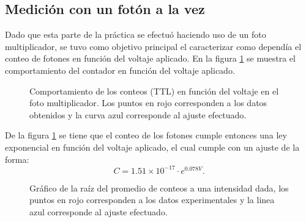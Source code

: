 \documentclass[%
 reprint,
 amsmath,amssymb,
 aps,
]{revtex4-1}
\begin{document}
{\subsection{Medición con un fotón a la vez}
Dado que esta parte de la práctica se efectuó haciendo uso de un foto multiplicador, se tuvo como objetivo principal el caracterizar como dependía el conteo de fotones en función del voltaje aplicado. En la figura \ref{fotomultiplicador} se muestra el comportamiento del contador en función del voltaje aplicado.

\begin{figure}[ht]
\caption{\label{fotomultiplicador}Comportamiento de los conteos (TTL) en función del voltaje en el foto multiplicador. Los puntos en rojo corresponden a los datos obtenidos y la curva azul corresponde al ajuste efectuado.}
\end{figure}

De la figura \ref{fotomultiplicador} se tiene que el conteo de los fotones cumple entonces una ley exponencial en función del voltaje aplicado, el cual cumple con un ajuste de la forma:
\begin{equation}
C=1.51\times10^{-17}\cdot e^{0.078V}.
\end{equation}

\begin{figure}[h]
\caption{\label{promedios_std} Gráfico de la raíz del promedio de conteos a una intensidad dada, los puntos en rojo corresponden a los datos experimentales y la linea azul corresponde al ajuste efectuado.}
\end{figure}

}
\end{document}
